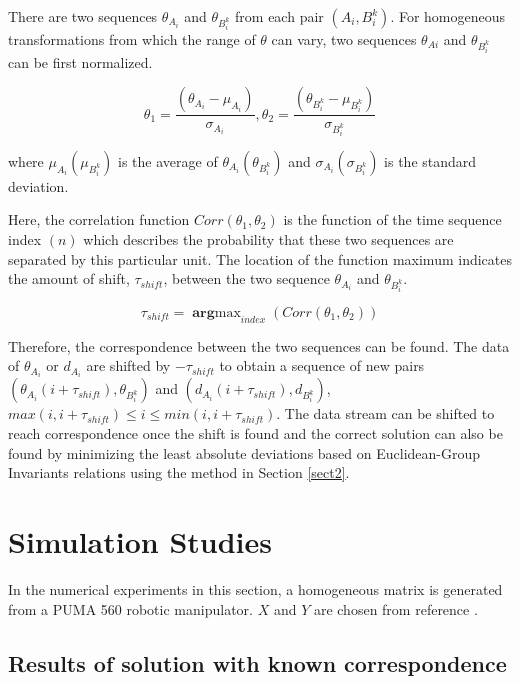 \documentclass[conference,letterpaper]{IEEEtran}
\begin{document}
There are two sequences $\theta_{A_{i}}$ and $\theta_{B_{i}^{k}}$ from each pair $(A_{i},B_{i}^{k})$. For homogeneous transformations from which the range of $\theta$ can vary, two sequences $\theta_{Ai}$ and $\theta_{B_{i}^{k}}$ can be first normalized.

\begin{equation}\label{equ26}
    \theta_{1}=\frac{(\theta_{A_{i}}-\mu_{A_{i}})}{\sigma_{A_{i}}}, \theta_{2}=\frac{(\theta_{B_{i}^{k}}-\mu_{B_{i}^{k}})}{\sigma_{B_{i}^{k}}}
\end{equation}

where $\mu_{A_{i}}(\mu_{B_{i}^{k}})$ is the average of $\theta_{A_{i}}(\theta_{B_{i}^{k}})$ and $\sigma_{A_{i}}(\sigma_{B_{i}^{k}})$ is the standard deviation.

Here, the correlation function $Corr(\theta_{1},\theta_{2})$  is the function of the time sequence index $(n)$ which describes the probability that these two sequences are separated by this particular unit. The location of the function maximum indicates the amount of shift, $\tau_{shift}$, between the two sequence $\theta_{A_{i}}$ and $\theta_{B_{i}^{k}}$.

\begin{equation}\label{equ27}
    \tau_{shift} = \mathop{\mathbf{arg}max}_{index}(Corr(\theta_{1},\theta_{2}))
\end{equation}

Therefore, the correspondence between the two sequences can be found. The data of $\theta_{A_{i}}$ or $d_{A_{i}}$ are shifted by $-\tau_{shift}$ to obtain a sequence of new pairs $(\theta_{A_{i}}(i+\tau_{shift}),\theta_{B_{i}^{k}})$ and $(d_{A_{i}}(i+\tau_{shift}),d_{B_{i}^{k}})$, $max(i,i+\tau_{shift})\leq i \leq min(i,i+\tau_{shift})$. The data stream can be shifted to reach correspondence once the shift is found and the correct solution can also be found by minimizing the least absolute deviations based on Euclidean-Group Invariants relations using the method in Section \ref{sect2}.


\section{Simulation Studies}
\label{sect4}

In the numerical experiments in this section, a homogeneous matrix   is generated from a PUMA 560 robotic manipulator. $X$ and $Y$ are chosen from reference .

\subsection{Results of solution with known correspondence}
\end{document}
